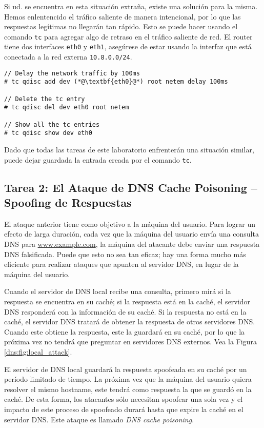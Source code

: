 Si ud. se encuentra en esta situación extraña, existe una solución para la misma. Hemos enlentencido el tráfico saliente de manera intencional, por lo que las respuestas legítimas no llegarán tan rápido. Esto se puede hacer usando el comando \texttt{tc} para agregar algo de retraso en el tráfico saliente de red.
El router tiene dos interfaces \texttt{eth0} y \texttt{eth1}, asegúrese de estar usando la interfaz que está conectada a la red externa \texttt{10.8.0.0/24}.


\begin{lstlisting}
// Delay the network traffic by 100ms
# tc qdisc add dev (*@\textbf{eth0}@*) root netem delay 100ms

// Delete the tc entry
# tc qdisc del dev eth0 root netem

// Show all the tc entries 
# tc qdisc show dev eth0
\end{lstlisting}
 
Dado que todas las tareas de este laboratorio enfrenterán una situación similar, puede dejar guardada la entrada creada por el comando \texttt{tc}.


\subsection{Tarea 2: El Ataque de DNS Cache Poisoning -- Spoofing de Respuestas}

El ataque anterior tiene como objetivo a la máquina del usuario. Para lograr un efecto de larga duración, cada vez que la máquina del usuario envía una consulta DNS para \url{www.example.com}, la máquina del atacante debe enviar una respuesta DNS falsificada.
Puede que esto no sea tan eficaz; hay una forma mucho más eficiente para realizar ataques que apunten al servidor DNS, en lugar de la máquina del usuario.

Cuando el servidor de DNS local recibe una consulta, primero mirá si la respuesta se encuentra en su caché; si la respuesta está en la caché, el servidor DNS responderá con la información de su caché.
Si la respuesta no está en la caché, el servidor DNS tratará de obtener la respuesta de otros servidores DNS. Cuando este obtiene la respuesta, este la guardará en su caché, por lo que la próxima vez no tendrá que preguntar en servidores DNS externos. Vea la Figura \ref{dns:fig:local_attack}. 

El servidor de DNS local guardará la respuesta spoofeada en su caché por un período limitado de tiempo. La próxima vez que la máquina del usuario quiera resolver el mismo hostname, este tendrá como respuesta la que se guardó en la caché.
De esta forma, los atacantes sólo necesitan spoofear una sola vez y el impacto de este proceso de spoofeado durará hasta que expire la caché en el servidor DNS.
Este ataque es llamado {\em DNS cache poisoning}.

